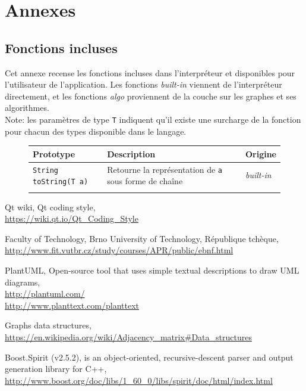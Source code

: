 \documentclass[french]{article}
\begin{document}
	\section{Annexes}
	
		\subsection{Fonctions incluses}
			\label{subsec:annexes-fonctions-incluses}
			Cet annexe recense les fonctions incluses dans l'interpréteur et disponibles pour l'utilisateur de l'application. Les fonctions \textit{built-in} viennent de l'interpréteur directement, et les fonctions \textit{algo} proviennent de la couche sur les graphes et ses algorithmes.\\
			
			Note: les paramètres de type \texttt{T} indiquent qu'il existe une surcharge de la fonction pour chacun des types disponible dans le langage.
			
			\begin{figure}[H]
				\centering
				\begin{tabular}{lll}
					Prototype & Description & Origine\\
					\hline
					\texttt{String toString(T a)} & Retourne la représentation de \texttt{a} sous forme de chaîne & \textit{built-in}\\
					\texttt{} & & \textit{}\\
				\end{tabular}
			\end{figure}
	
	\begin{thebibliography}{9}
		Qt wiki, Qt coding style,\\ \url{https://wiki.qt.io/Qt_Coding_Style}
		
		Faculty of Technology, Brno University of Technology, République tchèque,\\ \url{http://www.fit.vutbr.cz/study/courses/APR/public/ebnf.html}
		
		PlantUML, Open-source tool that uses simple textual descriptions to draw UML diagrams,\\ \url{http://plantuml.com/}\\ \url{http://www.planttext.com/planttext}

		Graphs data structures,\\ \url{https://en.wikipedia.org/wiki/Adjacency_matrix#Data_structures}
		
		Boost.Spirit (v2.5.2), is an object-oriented, recursive-descent parser and output generation library for C++,\\ \url{http://www.boost.org/doc/libs/1_60_0/libs/spirit/doc/html/index.html}
	\end{thebibliography}			
\end{document}
